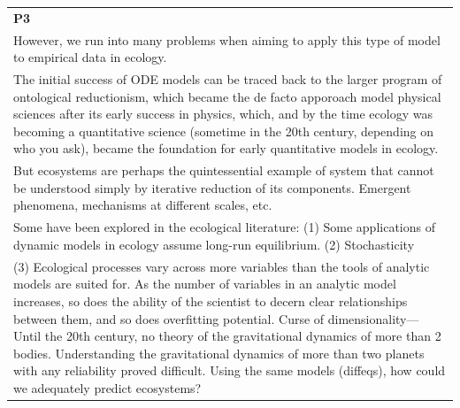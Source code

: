 \documentclass[10pt,oneside]{article}
\begin{document}
\begin{longtable}[]{@{}l@{}}
\toprule
\endhead
\begin{minipage}[t]{0.05\columnwidth}\raggedright
\textbf{P3}\strut
\end{minipage}\tabularnewline
\begin{minipage}[t]{0.05\columnwidth}\raggedright
However, we run into many problems when aiming to apply this type of
model to empirical data in ecology.\strut
\end{minipage}\tabularnewline
\begin{minipage}[t]{0.05\columnwidth}\raggedright
The initial success of ODE models can be traced back to the larger
program of ontological reductionism, which became the de facto apporoach
model physical sciences after its early success in physics, which, and
by the time ecology was becoming a quantitative science (sometime in the
20th century, depending on who you ask), became the foundation for early
quantitative models in ecology.\strut
\end{minipage}\tabularnewline
\begin{minipage}[t]{0.05\columnwidth}\raggedright
But ecosystems are perhaps the quintessential example of system that
cannot be understood simply by iterative reduction of its components.
Emergent phenomena, mechanisms at different scales, etc.\strut
\end{minipage}\tabularnewline
\begin{minipage}[t]{0.05\columnwidth}\raggedright
Some have been explored in the ecological literature: (1) Some
applications of dynamic models in ecology assume long-run equilibrium.
(2) Stochasticity\strut
\end{minipage}\tabularnewline
\begin{minipage}[t]{0.05\columnwidth}\raggedright
(3) Ecological processes vary across more variables than the tools of
analytic models are suited for. As the number of variables in an
analytic model increases, so does the ability of the scientist to decern
clear relationships between them, and so does overfitting potential.
Curse of dimensionality--- Until the 20th century, no theory of the
gravitational dynamics of more than 2 bodies. Understanding the
gravitational dynamics of more than two planets with any reliability
proved difficult. Using the same models (diffeqs), how could we
adequately predict ecosystems?\strut
\end{minipage}\tabularnewline
\bottomrule
\end{longtable}
\end{document}
